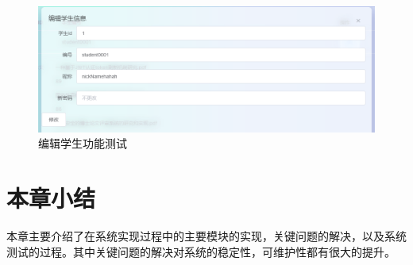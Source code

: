 \begin{figure}[htbp]
  \centering
  \includegraphics[scale = 0.6]{out/figure/测试/manage-edit-student-test.png}
  \caption{\song\wuhao 编辑学生功能测试}
  \label{manage-edit-student-test}
\end{figure}

\section{本章小结}

本章主要介绍了在系统实现过程中的主要模块的实现，关键问题的解决，以及系统测试的过程。其中关键问题的解决对系统的稳定性，可维护性都有很大的提升。